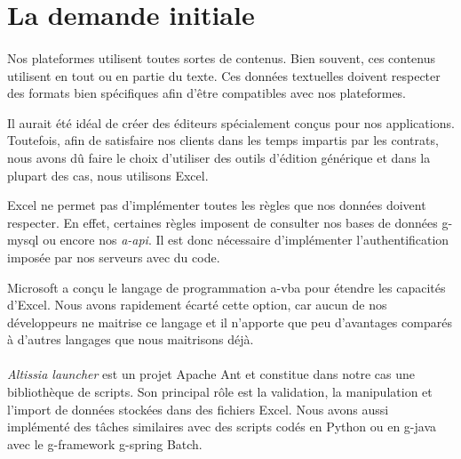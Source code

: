 \section{La demande initiale}
\label{sec:initial-request}

\paragraph{}
Nos plateformes utilisent toutes sortes de contenus.
Bien souvent, ces contenus utilisent en tout ou en partie du texte.
Ces données textuelles doivent respecter des formats bien spécifiques afin d'être compatibles avec nos plateformes.

Il aurait été idéal de créer des éditeurs spécialement conçus pour nos applications.
Toutefois, afin de satisfaire nos clients dans les temps impartis par les contrats, nous avons dû faire le choix d'utiliser des outils d'édition générique et dans la plupart des cas, nous utilisons Excel.

Excel ne permet pas d'implémenter toutes les règles que nos données doivent respecter.
En effet, certaines règles imposent de consulter nos bases de données \gls{g-mysql} ou encore nos \textit{\gls{a-api}}.
Il est donc nécessaire d'implémenter l'authentification imposée par nos serveurs avec du code.

Microsoft a conçu le langage de programmation \gls{a-vba} pour étendre les capacités d'Excel\cite{o365devx_pris_nodate}.
Nous avons rapidement écarté cette option, car aucun de nos développeurs ne maitrise ce langage et il n'apporte que peu d'avantages comparés à d'autres langages que nous maitrisons déjà.

\paragraph{}
\textit{Altissia launcher} est un projet Apache Ant\fnmark{} et constitue dans notre cas une bibliothèque de scripts.
Son principal rôle est la validation, la manipulation et l'import de données stockées dans des fichiers Excel.
Nous avons aussi implémenté des tâches similaires avec des scripts codés en Python\fnmark{} ou en \gls{g-java} avec le \gls{g-framework} \Gls{g-spring} Batch\fnmark{}.

